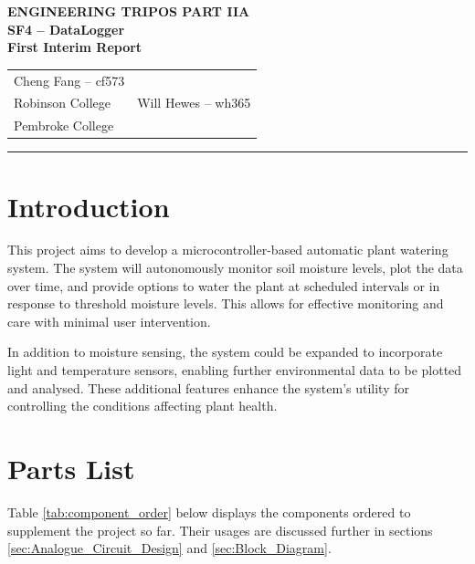 \documentclass[a4paper,11pt]{article}
\renewcommand{\maketitle}{
    \begin{center}
        \LARGE \textbf{ENGINEERING TRIPOS PART IIA} \\[0.5em]
        \Large \textbf{SF4 – DataLogger} \\[0.5em]
        \textbf{First Interim Report} \\[1.5em]
        \begin{tabularx}{0.7\textwidth}{X X}
            \centering \large Cheng Fang -- cf573 \\ \large Robinson College &
            \centering \large Will Hewes -- wh365 \\ \large Pembroke College
        \end{tabularx}
        \vspace{1em}
    \end{center}
}
\begin{document}
\maketitle
\hrule
\tableofcontents
\newpage

\section{Introduction}
\label{sec:Introduction}

This project aims to develop a microcontroller-based 
automatic plant watering system.
The system will autonomously monitor soil moisture levels, 
plot the data over time, and provide options to water the plant
at scheduled intervals or in response to threshold moisture levels.
This allows for effective monitoring and care with minimal user intervention.

In addition to moisture sensing, the system could be expanded to 
incorporate light and temperature sensors,
enabling further environmental data to be plotted and analysed.
These additional features enhance the system's utility
for controlling the conditions affecting plant health.

\section{Parts List}
\label{sec:Parts_List}

Table \ref{tab:component_order} below displays the components 
ordered to supplement the project so far.
Their usages are discussed further in sections 
\ref{sec:Analogue_Circuit_Design} and \ref{sec:Block_Diagram}.

\begin{table}[H]
    \centering
    \caption{Component Order Summary}
    \label{tab:component_order}
\end{table}
\end{document}
